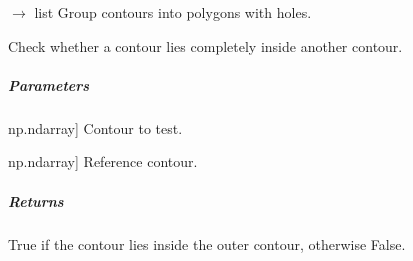 \documentclass[letterpaper,10pt,english]{sphinxmanual}
\begin{document}
\begin{fulllineitems}

\begin{fulllineitems}
\label{\detokenize{mirte_lc_nav2.navigator_types:mirte_lc_nav2.navigator_types.SystematicNavigator.find_polygon_groups}}
\pysigstartsignatures
\pysiglinewithargsret
{}
{}
{{ $\rightarrow$ list}}
\pysigstopsignatures
\sphinxAtStartPar
Group contours into polygons with holes.

\end{fulllineitems}


\begin{fulllineitems}
\label{\detokenize{mirte_lc_nav2.navigator_types:mirte_lc_nav2.navigator_types.SystematicNavigator.is_inside}}
\pysigstartsignatures
\pysiglinewithargsret
{}
{\sphinxparamcomma {}}
{}
\pysigstopsignatures
\sphinxAtStartPar
Check whether a contour lies completely inside another contour.


\subparagraph{Parameters}
\label{\detokenize{mirte_lc_nav2.navigator_types:id1}}\begin{description}
\sphinxlineitem{contour}{[}np.ndarray{]}
\sphinxAtStartPar
Contour to test.

\sphinxlineitem{outer\_contour}{[}np.ndarray{]}
\sphinxAtStartPar
Reference contour.

\end{description}


\subparagraph{Returns}
\label{\detokenize{mirte_lc_nav2.navigator_types:id2}}\begin{description}
\sphinxAtStartPar
True if the contour lies inside the outer contour,
otherwise False.

\end{description}

\end{fulllineitems}



\end{fulllineitems}
\end{document}
